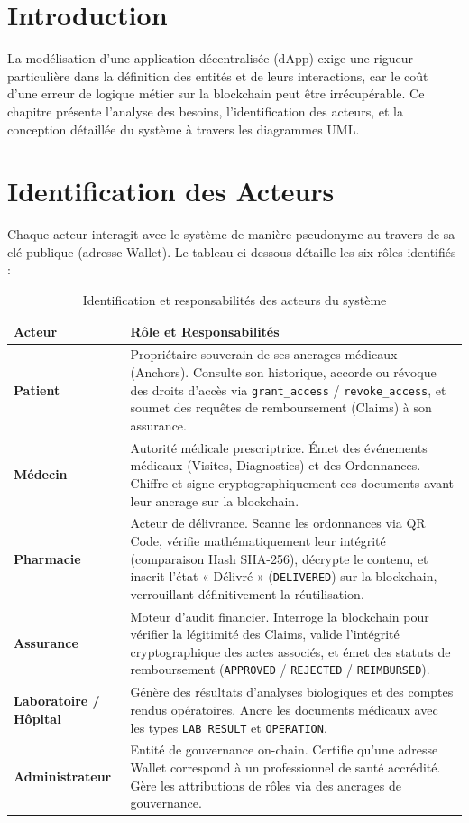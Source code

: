 \documentclass[12pt,a4paper]{report}
\begin{document}
\section{Introduction}
La modélisation d'une application décentralisée (dApp) exige une rigueur particulière dans la définition des entités et de leurs interactions, car le coût d'une erreur de logique métier sur la blockchain peut être irrécupérable. Ce chapitre présente l'analyse des besoins, l'identification des acteurs, et la conception détaillée du système à travers les diagrammes UML.

\section{Identification des Acteurs}
Chaque acteur interagit avec le système de manière pseudonyme au travers de sa clé publique (adresse Wallet). Le tableau ci-dessous détaille les six rôles identifiés :

\begin{table}[H]
    \centering
    \caption{Identification et responsabilités des acteurs du système}
    \label{tab:acteurs}
    \begin{tabular}{|p{3cm}|p{10.5cm}|}
        \hline
        \textbf{Acteur} & \textbf{Rôle et Responsabilités} \\
        \hline
        \textbf{Patient} & Propriétaire souverain de ses ancrages médicaux (Anchors). Consulte son historique, accorde ou révoque des droits d'accès via \texttt{grant\_access} / \texttt{revoke\_access}, et soumet des requêtes de remboursement (Claims) à son assurance. \\
        \hline
        \textbf{Médecin} & Autorité médicale prescriptrice. Émet des événements médicaux (Visites, Diagnostics) et des Ordonnances. Chiffre et signe cryptographiquement ces documents avant leur ancrage sur la blockchain. \\
        \hline
        \textbf{Pharmacie} & Acteur de délivrance. Scanne les ordonnances via QR Code, vérifie mathématiquement leur intégrité (comparaison Hash SHA-256), décrypte le contenu, et inscrit l'état « Délivré » (\texttt{DELIVERED}) sur la blockchain, verrouillant définitivement la réutilisation. \\
        \hline
        \textbf{Assurance} & Moteur d'audit financier. Interroge la blockchain pour vérifier la légitimité des Claims, valide l'intégrité cryptographique des actes associés, et émet des statuts de remboursement (\texttt{APPROVED} / \texttt{REJECTED} / \texttt{REIMBURSED}). \\
        \hline
        \textbf{Laboratoire / Hôpital} & Génère des résultats d'analyses biologiques et des comptes rendus opératoires. Ancre les documents médicaux avec les types \texttt{LAB\_RESULT} et \texttt{OPERATION}. \\
        \hline
        \textbf{Administrateur} & Entité de gouvernance on-chain. Certifie qu'une adresse Wallet correspond à un professionnel de santé accrédité. Gère les attributions de rôles via des ancrages de gouvernance. \\
        \hline
    \end{tabular}
\end{table}
\end{document}
